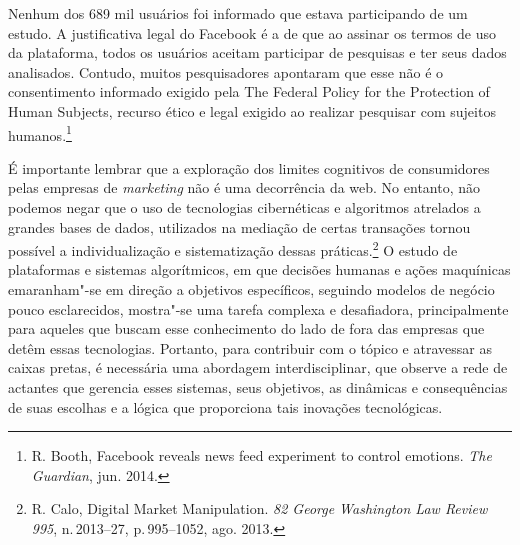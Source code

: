 Nenhum dos 689 mil usuários foi informado que estava participando de um
estudo. A justificativa legal do Facebook é a de que ao assinar os
termos de uso da plataforma, todos os usuários aceitam participar de
pesquisas e ter seus dados analisados. Contudo, muitos pesquisadores
apontaram que esse não é o consentimento informado exigido pela The
Federal Policy for the Protection of Human Subjects, recurso ético e
legal exigido ao realizar pesquisar com sujeitos humanos.\footnote{R. Booth, Facebook reveals news feed experiment to control emotions. \textit{The Guardian}, jun. 2014.}

É importante lembrar que a exploração dos limites cognitivos de
consumidores pelas empresas de \textit{marketing} não é uma decorrência da web.
No entanto, não podemos negar que o uso de tecnologias cibernéticas e
algoritmos atrelados a grandes bases de dados, utilizados na mediação de
certas transações tornou possível a individualização e sistematização
dessas práticas.\footnote{R. Calo, Digital Market Manipulation. \textit{82 George Washington Law Review 995}, n.\,2013--27, p.\,995--1052, ago. 2013.} O estudo de plataformas e sistemas
algorítmicos, em que decisões humanas e ações maquínicas emaranham"-se em
direção a objetivos específicos, seguindo modelos de negócio pouco
esclarecidos, mostra"-se uma tarefa complexa e desafiadora,
principalmente para aqueles que buscam esse conhecimento do lado de fora
das empresas que detêm essas tecnologias. Portanto, para contribuir com
o tópico e atravessar as caixas pretas, é necessária uma abordagem
interdisciplinar, que observe a rede de actantes que gerencia esses
sistemas, seus objetivos, as dinâmicas e consequências de suas escolhas
e a lógica que proporciona tais inovações tecnológicas.


